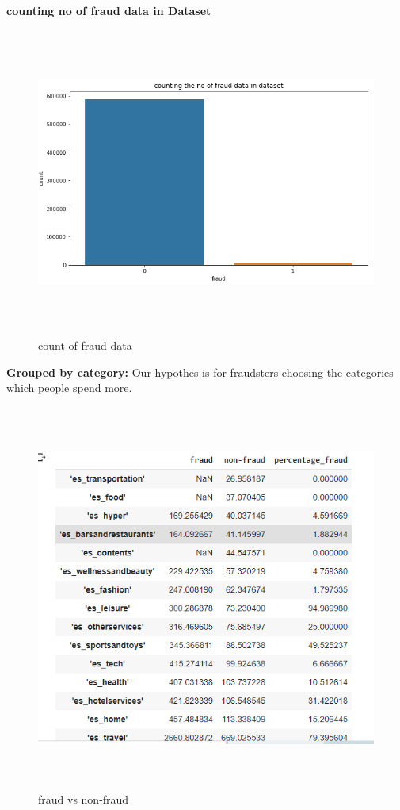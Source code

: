 \documentclass[12pt]{article}
\begin{document}
\pagebreak
\textbf{counting no of fraud data in Dataset}
          \begin{figure}[htp]
    \centering
                \includegraphics[height=4in]{i13.png}

    \caption{count of fraud data}
    \label{fig:galaxy}
\end{figure}
\pagebreak
\textbf{Grouped by category:}
Our hypothes is for fraudsters choosing the categories which people spend more.
 \begin{figure}[htp]
    \centering
                \includegraphics[height=5in]{i3.png}

    \caption{fraud vs non-fraud}
    \label{fig:galaxy}
\end{figure}
\end{document}
